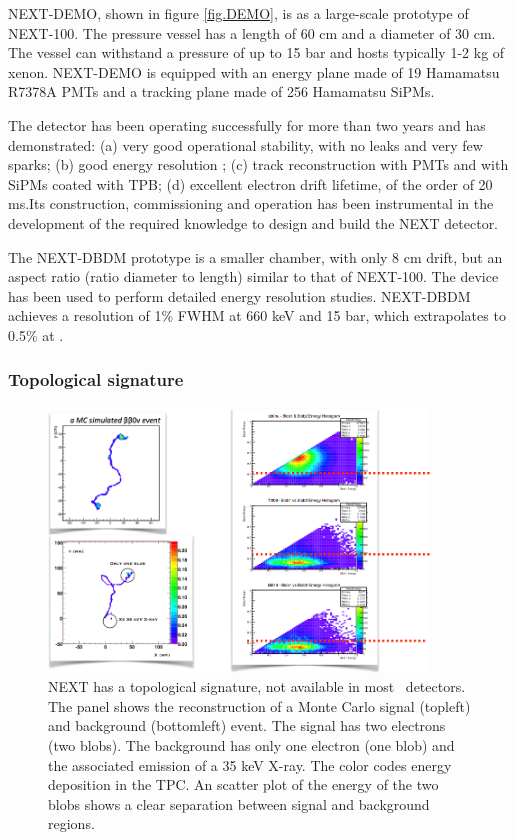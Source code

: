 NEXT-DEMO, shown in figure \ref{fig.DEMO}, is as a large-scale prototype of NEXT-100. The pressure vessel has a length of 60 cm and a diameter of 30 cm. The vessel can withstand a pressure of up to 15 bar and hosts typically 1-2 kg of xenon. NEXT-DEMO is  equipped with an energy plane made of 19 Hamamatsu R7378A PMTs and a tracking plane made of 256 Hamamatsu SiPMs. 

The detector has been operating successfully for more than two years and has demonstrated: (a) very good operational stability, with no leaks and very few sparks; (b) good energy resolution ; (c) track reconstruction with PMTs and with SiPMs coated with TPB; (d) excellent electron drift lifetime, of the order of 20 ms.Its construction, commissioning and operation has been instrumental in the development of the required knowledge to design and build the NEXT detector.

The NEXT-DBDM prototype is a smaller chamber, with only 8 cm drift, but an aspect ratio (ratio diameter to length) similar to that of NEXT-100. The device has been used to perform detailed energy resolution studies. NEXT-DBDM achieves a resolution of 1\% FWHM at 660 keV and 15 bar, which extrapolates to 0.5\% at \Qbb.

\subsubsection*{Topological signature}

\begin{figure}
\centering
\includegraphics[width=0.9\textwidth]{img/Topology.png}
\caption{\small NEXT has a topological signature, not available in most \bbonu\ detectors. The panel shows the reconstruction of a Monte Carlo signal (topleft) and background (bottomleft) event. The signal has two electrons (two blobs). The background has only one electron (one blob) and the associated emission of a 35 keV X-ray. The color codes energy deposition in the TPC. An scatter plot of the energy of the two blobs shows a clear separation between signal and background regions.}\label{fig.ETRK2}
\end{figure}

